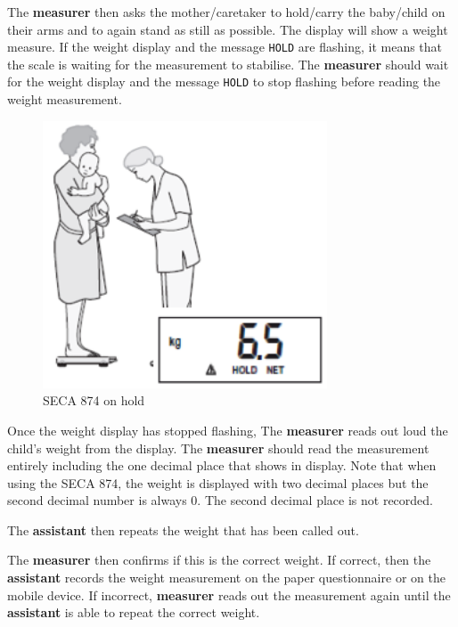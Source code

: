 \documentclass[
  12pt,
]{book}
\begin{document}
The \textbf{measurer} then asks the mother/caretaker to hold/carry the baby/child on their arms and to again stand as still as possible. The display will show a weight measure. If the weight display and the message \texttt{HOLD} are flashing, it means that the scale is waiting for the measurement to stabilise. The \textbf{measurer} should wait for the weight display and the message \texttt{HOLD} to stop flashing before reading the weight measurement.

\begin{figure}

{\centering \includegraphics[width=3.32in]{images/seca874hold} 

}

\caption{SECA 874 on hold}\label{fig:weight12}
\end{figure}

Once the weight display has stopped flashing, The \textbf{measurer} reads out loud the child's weight from the display. The \textbf{measurer} should read the measurement entirely including the one decimal place that shows in display. Note that when using the SECA 874, the weight is displayed with two decimal places but the second decimal number is always 0. The second decimal place is not recorded.

The \textbf{assistant} then repeats the weight that has been called out.

The \textbf{measurer} then confirms if this is the correct weight. If correct, then the \textbf{assistant} records the weight measurement on the paper questionnaire or on the mobile device. If incorrect, \textbf{measurer} reads out the measurement again until the \textbf{assistant} is able to repeat the correct weight.

~
\end{document}
